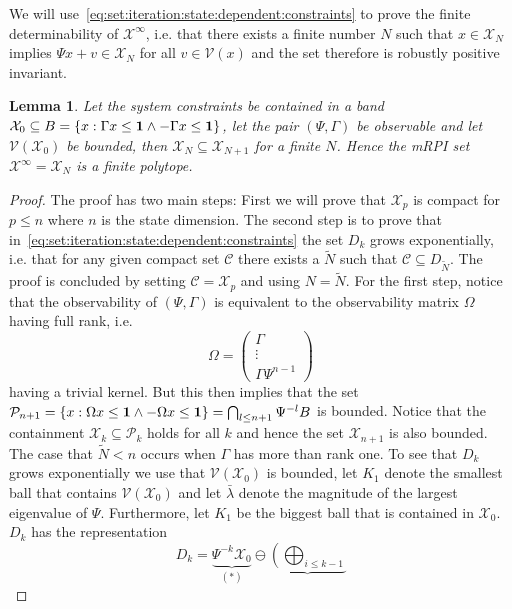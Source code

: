 \documentclass[letterpaper, 10pt, conference]{ieeeconf} %
\newtheorem{thm}{Lemma}[section]
\begin{document}
%
We will use~\eqref{eq:set:iteration:state:dependent:constraints} to prove the finite determinability of
$\mathcal X^\infty$, i.e. that there exists a finite number $N$ such that $x\in\mathcal X_N$ implies
$\Psi x + v \in\mathcal X_N$ for all $v\in\mathcal V(x)$ and the set therefore is robustly positive invariant.
%
\begin{thm}\label{thm:finite:mRPI:set:state:dependable}
Let the system constraints be contained in a band $\mathcal X_0\subseteq B=\{x:\Gamma x\leq{\bf{1}}\wedge 
-\Gamma x\leq{\bf{1}}\}$, let the pair $(\Psi,\Gamma)$ be observable and let $\mathcal V(\mathcal X_0)$ be bounded, 
then $\mathcal X_N\subseteq \mathcal X_{N+1}$ for a finite $N$. Hence the mRPI set $\mathcal X^\infty 
=\mathcal X_N$ is a finite polytope.
\end{thm}
%
\begin{proof}
The proof has two main steps: First we will prove that $\mathcal X_p$ is compact for $p\leq n$
where $n$ is the state dimension. The second step is to prove that in~\eqref{eq:set:iteration:state:dependent:constraints}
the set $D_k$ grows exponentially, i.e. that for any given compact set $\mathcal C$ there exists
a $\tilde N$ such that $\mathcal C\subseteq D_{\tilde N}$. The proof is concluded by setting 
$\mathcal C = \mathcal X_p$ and using $N = \tilde N$. For the first step, notice that the observability of
$(\Psi,\Gamma)$ is equivalent to the observability matrix $\Omega$ having full rank, i.e.
\[
\Omega = \left(\begin{array}{c}
\Gamma\\ \vdots \\ \Gamma\Psi^{n-1}
\end{array}\right)
\]
having a trivial kernel. But this then implies that the set $\mathcal P_{n+1} = \{x: 
\Omega x\leq{\bf{1}}\wedge-\Omega x\leq{\bf{1}}\} = \bigcap_{l\leq n+1} \Psi^{-l} B$ is bounded.
Notice that the containment $\mathcal X_k\subseteq \mathcal P_k$ holds for all $k$ and hence
the set $\mathcal X_{n+1}$ is also bounded. The case that $\tilde N<n$ occurs when $\Gamma$
has more than rank one. To see that $D_k$ grows exponentially we use that $\mathcal V(\mathcal X_0)$
is bounded, let $K_1$ denote the smallest ball that contains $\mathcal V(\mathcal X_0)$ and let
$\bar\lambda$ denote the magnitude of the largest eigenvalue of $\Psi$. Furthermore, let $K_1$
be the biggest ball that is contained in $\mathcal X_{0}$. $D_k$ has the representation
\begin{equation}
D_k = \underbrace{\Psi^{-k}\mathcal X_0}_{(\ast)} \ominus \underbrace{\left(\bigoplus_{i\leq k-1} 
}
\end{equation}
\end{proof}
\end{document}
